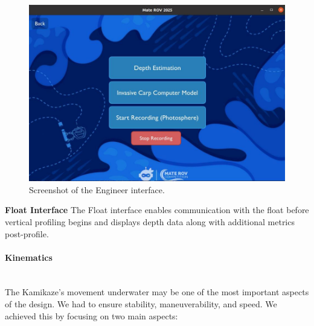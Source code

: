 \begin{figure}[h]
    \centering
    \includegraphics[width=0.8\columnwidth]{Sections/2Design Rationale/images/Engineer_interface.jpeg}
    \caption{Screenshot of the Engineer interface.}
    \label{fig:Engineer_interface}
\end{figure}

\vspace{0.2cm}
\textbf{Float Interface}
The Float interface enables communication with the float before vertical profiling begins and displays depth data along with additional metrics post-profile.

\vspace{-0.3cm}
\paragraph{Kinematics} \ \\
The Kamikaze's movement underwater may be one of the most important aspects of the design. We had to ensure stability, maneuverability, and speed. We achieved this by focusing on two main aspects:

